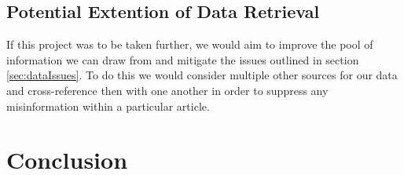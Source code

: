 \documentclass[bsc,frontabs,twoside,singlespacing,parskip,deptreport]{infthesis}     %
\begin{document}
\subsection{Potential Extention of Data Retrieval}
If this project was to be taken further, we would aim to improve the pool of information we can draw from and mitigate the issues outlined in section \ref{sec:dataIssues}.
To do this we would consider multiple other sources for our data and cross-reference then with one another in order to suppress any misinformation within
a particular article.


\section{Conclusion}


\end{document}
